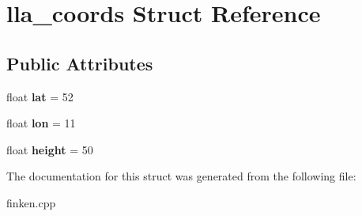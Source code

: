 \hypertarget{structlla__coords}{}\section{lla\+\_\+coords Struct Reference}
\label{structlla__coords}
\subsection*{Public Attributes}
\begin{DoxyCompactItemize}
\item 
float {\bfseries lat} = 52\hypertarget{structlla__coords_a1c1072469e8272e10fba298c2a21656c}{}\label{structlla__coords_a1c1072469e8272e10fba298c2a21656c}

\item 
float {\bfseries lon} = 11\hypertarget{structlla__coords_a28ccc6c3e258a13b931102479a81d309}{}\label{structlla__coords_a28ccc6c3e258a13b931102479a81d309}

\item 
float {\bfseries height} = 50\hypertarget{structlla__coords_abdc3be56573ef86b19d3e4638558f1f2}{}\label{structlla__coords_abdc3be56573ef86b19d3e4638558f1f2}

\end{DoxyCompactItemize}


The documentation for this struct was generated from the following file\+:\begin{DoxyCompactItemize}
\item 
finken.\+cpp\end{DoxyCompactItemize}
